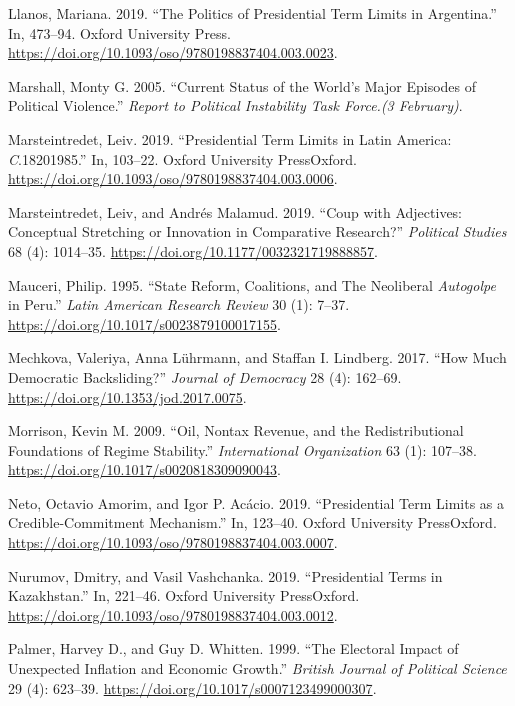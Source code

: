 \documentclass[
  12pt,
]{report}
\newlength{\cslhangindent}
\newenvironment{CSLReferences}[2] %
 {\begin{list}{}{%
  \setlength{\itemindent}{0pt}
  \setlength{\leftmargin}{0pt}
  \setlength{\parsep}{0pt}
  \ifodd #1
   \setlength{\leftmargin}{\cslhangindent}
   \setlength{\itemindent}{-1\cslhangindent}
  \fi
  \setlength{\itemsep}{#2\baselineskip}}}
 {\end{list}}
\begin{document}
\begin{CSLReferences}{1}{0}
Llanos, Mariana. 2019. {``The Politics of Presidential Term Limits in
Argentina.''} In, 473--94. Oxford University Press.
\url{https://doi.org/10.1093/oso/9780198837404.003.0023}.

Marshall, Monty G. 2005. {``Current Status of the World's Major Episodes
of Political Violence.''} \emph{Report to Political Instability Task
Force.(3 February)}.

Marsteintredet, Leiv. 2019. {``Presidential Term Limits in Latin
America: {\emph{C}}.1820{\textendash}1985.''} In, 103--22. Oxford
University PressOxford.
\url{https://doi.org/10.1093/oso/9780198837404.003.0006}.

Marsteintredet, Leiv, and Andrés Malamud. 2019. {``Coup with Adjectives:
Conceptual Stretching or Innovation in Comparative Research?''}
\emph{Political Studies} 68 (4): 1014--35.
\url{https://doi.org/10.1177/0032321719888857}.

Mauceri, Philip. 1995. {``State Reform, Coalitions, and The Neoliberal
{\emph{Autogolpe}} in Peru.''} \emph{Latin American Research Review} 30
(1): 7--37. \url{https://doi.org/10.1017/s0023879100017155}.

Mechkova, Valeriya, Anna Lührmann, and Staffan I. Lindberg. 2017. {``How
Much Democratic Backsliding?''} \emph{Journal of Democracy} 28 (4):
162--69. \url{https://doi.org/10.1353/jod.2017.0075}.

Morrison, Kevin M. 2009. {``Oil, Nontax Revenue, and the
Redistributional Foundations of Regime Stability.''} \emph{International
Organization} 63 (1): 107--38.
\url{https://doi.org/10.1017/s0020818309090043}.

Neto, Octavio Amorim, and Igor P. Acácio. 2019. {``Presidential Term
Limits as a Credible-Commitment Mechanism.''} In, 123--40. Oxford
University PressOxford.
\url{https://doi.org/10.1093/oso/9780198837404.003.0007}.

Nurumov, Dmitry, and Vasil Vashchanka. 2019. {``Presidential Terms in
Kazakhstan.''} In, 221--46. Oxford University PressOxford.
\url{https://doi.org/10.1093/oso/9780198837404.003.0012}.

Palmer, Harvey D., and Guy D. Whitten. 1999. {``The Electoral Impact of
Unexpected Inflation and Economic Growth.''} \emph{British Journal of
Political Science} 29 (4): 623--39.
\url{https://doi.org/10.1017/s0007123499000307}.


\end{CSLReferences}
\end{document}
